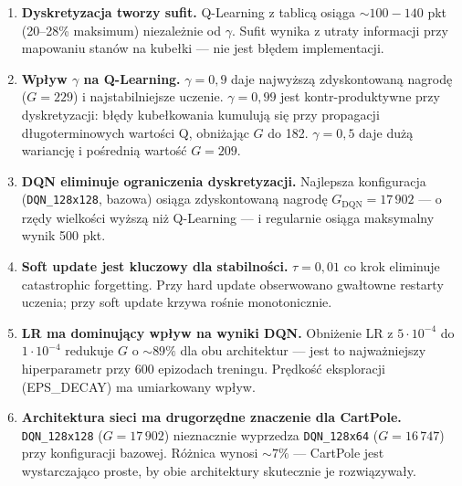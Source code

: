 \documentclass[12pt,a4paper]{article}
\begin{document}
\begin{enumerate}
    \item \textbf{Dyskretyzacja tworzy sufit.}
    Q-Learning z tablicą osiąga $\sim 100{-}140$ pkt (20–28\% maksimum)
    niezależnie od $\gamma$. Sufit wynika z utraty informacji przy
    mapowaniu stanów na kubełki — nie jest błędem implementacji.

    \item \textbf{Wpływ $\gamma$ na Q-Learning.}
    $\gamma = 0{,}9$ daje najwyższą zdyskontowaną nagrodę ($G = 229$)
    i najstabilniejsze uczenie. $\gamma = 0{,}99$ jest
    kontr-produktywne przy dyskretyzacji: błędy kubełkowania kumulują
    się przy propagacji długoterminowych wartości Q, obniżając $G$
    do 182. $\gamma = 0{,}5$ daje dużą wariancję i pośrednią wartość
    $G = 209$.

    \item \textbf{DQN eliminuje ograniczenia dyskretyzacji.}
    Najlepsza konfiguracja (\texttt{DQN\_128x128}, bazowa) osiąga
    zdyskontowaną nagrodę $G_{\text{DQN}} = 17\,902$ — o rzędy
    wielkości wyższą niż Q-Learning — i regularnie osiąga maksymalny
    wynik 500 pkt.

    \item \textbf{Soft update jest kluczowy dla stabilności.}
    $\tau = 0{,}01$ co krok eliminuje catastrophic forgetting.
    Przy hard update obserwowano gwałtowne restarty uczenia;
    przy soft update krzywa rośnie monotonicznie.

    \item \textbf{LR ma dominujący wpływ na wyniki DQN.}
    Obniżenie LR z $5 \cdot 10^{-4}$ do $1 \cdot 10^{-4}$
    redukuje $G$ o $\sim 89\%$ dla obu architektur —
    jest to najważniejszy hiperparametr przy 600 epizodach treningu.
    Prędkość eksploracji (EPS\_DECAY) ma umiarkowany wpływ.

    \item \textbf{Architektura sieci ma drugorzędne znaczenie dla CartPole.}
    \texttt{DQN\_128x128} ($G = 17\,902$) nieznacznie wyprzedza
    \texttt{DQN\_128x64} ($G = 16\,747$) przy konfiguracji bazowej.
    Różnica wynosi $\sim 7\%$ — CartPole jest wystarczająco proste,
    by obie architektury skutecznie je rozwiązywały.
\end{enumerate}
\end{document}
